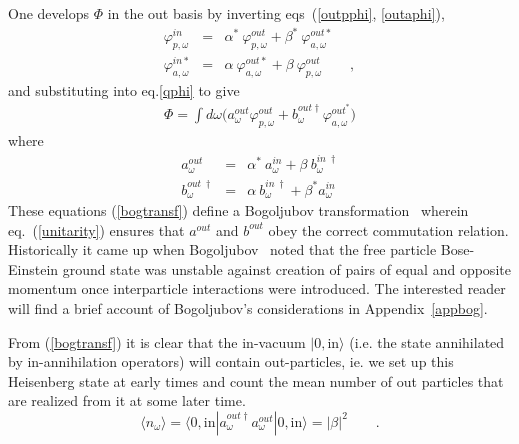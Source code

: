 \documentclass[12pt,oneside]{report}
\def\elematrice#1#2#3{\langle #1|#2|#3 \rangle}
\begin{document}
\par One develops $\Phi$  in the out basis
by inverting  eqs~(\ref{outpphi}, \ref{outaphi}),
\begin{eqnarray}
\varphi^{in}_{p,\omega} & = & \alpha^* \ \varphi^{out}_{p,\omega}
+ \beta ^{*} \ \varphi^{out*}_{a,\omega} \label{inpout} \nonumber \\
\varphi^{in*}_{a,\omega} & = & \alpha \ \varphi^{out*}_{a,\omega}
+ \beta \ \varphi^{out}_{p,\omega}\qquad , \label{inaout}
\end{eqnarray}
 and substituting into eq.\ref{qphi} to give
\begin{eqnarray}
\Phi = \int d\omega \bigl(a^{out}_\omega \varphi^{out}_{p,\omega} +
b^{out\dagger }_\omega \varphi^{out^*}_{a,\omega}\bigr)\label{phiout}
\end{eqnarray}
where
\begin{eqnarray}
a^{out}_{\omega} & = & \alpha^*\ a^{in}_\omega + \beta\ b^{in \ \dagger }_{\omega}
\nonumber \\
b^{out \ \dagger }_{\omega} & = & \alpha \ b^{in \ \dagger }_\omega +
 \beta ^* a^{in}_{\omega}\
\label{bogtransf}
\end{eqnarray}
These equations (\ref{bogtransf}) define a Bogoljubov 
transformation~\cite{BD}
wherein eq.~(\ref{unitarity}) ensures that $a^{out}$ and $b^{out}$ obey
the correct commutation relation.  Historically it came up
when Bogoljubov~\cite{Bogo} 
noted that the free particle Bose-Einstein ground
state was unstable against creation of pairs of equal and opposite momentum
once interparticle interactions were introduced.   The interested reader
will find a brief account of Bogoljubov's considerations in 
Appendix~\ref{appbog}.
\par From (\ref{bogtransf}) it is clear that the in-vacuum $
\vert 0,\mbox{in} \rangle $ (i.e. the
state annihilated by in-annihilation operators) will contain out-particles,
ie. we set up this Heisenberg state at early times and count the mean number of
out particles that are realized from it at some later time.
\begin{equation} 
\langle
n_{\omega}\rangle = 
\elematrice{0,\mbox{in}}{a^{out\dagger }_{\omega}a_{\omega}^{out}}{0,\mbox{in}}
=|\beta|^2 
 \qquad .\label{nout}
\end{equation}
\end{document}
